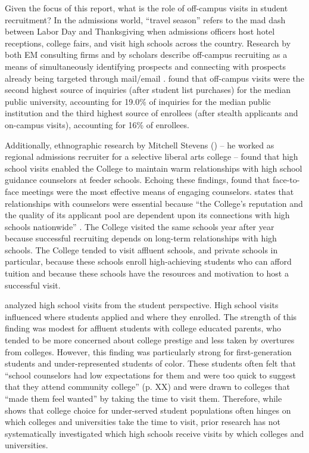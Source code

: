 \documentclass[twoside]{article}
\begin{document}
Given the focus of this report, what is the role of off-campus visits in student recruitment? In the admissions world, ``travel season'' refers to the mad dash between Labor Day and Thanksgiving when admissions officers host hotel receptions, college fairs, and visit high schools across the country. Research by both EM consulting firms and by scholars describe off-campus recruiting as a means of simultaneously identifying prospects and connecting with prospects already being targeted through mail/email \citep[e.g., ][]{RN4323,RN4315,RN3519}.  \cite{RN4402} found that off-campus visits were the second highest source of inquiries (after student list purchases) for the median public university, accounting for 19.0\% of inquiries for the median public institution and the third highest source of enrollees (after stealth applicants and on-campus visits), accounting for 16\% of enrollees.

Additionally, ethnographic research by Mitchell Stevens (\citeyear{RN3519}) -- he worked as regional admissions recruiter for a selective liberal arts college -- found that high school visits enabled the College to maintain warm relationships with high school guidance counselors at feeder schools.  Echoing these findings, \cite{RN4402} found that face-to-face meetings were the most effective means of engaging counselors. \cite{RN3519} states that relationships with counselors were essential because ``the College's reputation and the quality of its applicant pool are dependent upon its connections with high schools nationwide'' \citep[p.~53]{RN3519}.  The College visited the same schools year after year because successful recruiting depends on long-term relationships with high schools. The College tended to visit affluent schools, and private schools in particular, because these schools enroll high-achieving students who can afford tuition and because these schools have the resources and motivation to host a successful visit.  


\cite{RN4324} analyzed high school visits from the student perspective. High school visits influenced where students applied and where they enrolled. The strength of this finding was modest for affluent students with college educated parents, who tended to be more concerned about college prestige and less taken by overtures from colleges. However, this finding was particularly strong for first-generation students and under-represented students of color.  These students often felt that ``school counselors had low expectations for them and were too quick to suggest that they attend community college'' (p. XX) and were drawn to colleges that ``made them feel wanted'' by taking the time to visit them.  Therefore, while \cite{RN4324} shows that college choice for under-served student populations often hinges on which colleges and universities take the time to visit, prior research has not systematically investigated which high schools receive visits by which colleges and universities.
\end{document}
